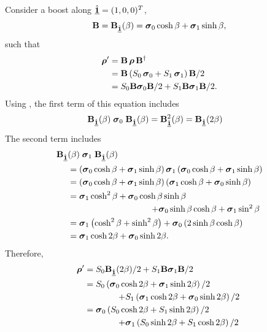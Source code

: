 \noindent
Consider a boost along $\hat{\Pv{1}}=(1,0,0)^T$, 
$$\Boost = \vBoost[1](\beta) =\pauli{0}\cosh\beta+\pauli{1}\sinh\beta,$$ 
such that
\begin{equation} \begin{split}
\cohM{\rho}' &= \Boost \, \cohM{\rho} \, \Boost^\dagger \\
&= \Boost \left( S_0 \, \pauli{0}+S_1 \, \pauli{1} \right) \Boost / 2 \\
&= S_0 \Boost \pauli{0} \Boost/2 +S_1 \Boost \pauli{1} \Boost/2.
\end{split} \end{equation}
Using , the first term of this equation
includes 
\begin{equation} \begin{split}
\vBoost[1](\beta) \; \pauli{0} \; \vBoost[1](\beta)
&=\vBoost[1]^2(\beta) = \vBoost[1](2\beta)
\end{split} \end{equation}
%
The second term includes
%
%
\begin{equation} \begin{split}
\vBoost[1]&(\beta) \; \pauli{1} \; \vBoost[1](\beta)  \\
&= \left( \pauli{0}\cosh\beta + \pauli{1}\sinh\beta \right) \pauli{1} \left( \pauli{0}\cosh\beta + \pauli{1}\sinh\beta \right) \\
&= \left( \pauli{0}\cosh\beta + \pauli{1}\sinh\beta \right) \left( \pauli{1}\cosh\beta + \pauli{0}\sinh\beta \right) \\
&= \pauli{1}\cosh^2\beta + \pauli{0}\cosh\beta\sinh\beta \\
& \omit\hfill\ensuremath{ + \pauli{0}\sinh\beta\cosh\beta + \pauli{1}\sin^2\beta } \\
&= \pauli{1} \left(\cosh^2\beta + \sinh^2\beta\right) + \pauli{0} \left( 2 \sinh\beta\cosh\beta \right) \\
&= \pauli{1} \cosh 2\beta + \pauli{0} \sinh 2\beta.
\end{split} \end{equation}
%
Therefore,
%
\begin{equation} \begin{split}
\cohM{\rho}' &= S_0 \vBoost[1](2\beta)/2 + S_1 \Boost \pauli{1} \Boost/2 \\
&= S_0 \left(  \pauli{0} \cosh 2\beta + \pauli{1} \sinh 2\beta \right)/2 \\
& \omit \quad \quad \quad \quad \ensuremath{+ S_1 \left( \pauli{1} \cosh 2\beta + \pauli{0} \sinh 2\beta \right)/2} \\
&= \pauli{0} \left( S_0 \cosh 2\beta + S_1 \sinh 2\beta \right)/2\\
& \omit \quad \quad \quad \quad \ensuremath{+ \pauli{1} \left( S_0 \sinh 2\beta + S_1 \cosh 2\beta \right)/2}
\end{split} \end{equation}
